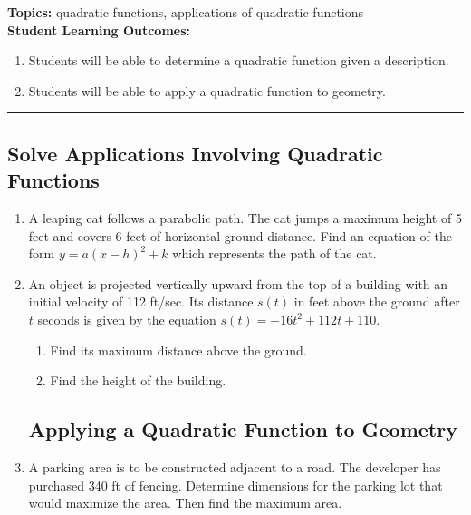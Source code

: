 
\noindent \textbf{Topics:}  quadratic functions, applications of quadratic functions\\

\noindent \textbf{Student Learning Outcomes:}
\begin{enumerate}
\item Students will be able to determine a quadratic function given a description.
\item Students will be able to apply a quadratic function to geometry.
\end{enumerate}

\hrule 

\bigskip

\subsection{Solve Applications Involving Quadratic Functions}


\begin{enumerate}
\item A leaping cat follows a parabolic path. The cat jumps a maximum height of 5 feet and covers 6 feet of horizontal ground distance. Find an equation of the form $y = a(x-h)^2+k$ which represents the path of the cat. \vfill

\item An object is projected vertically upward from the top of a building with an initial velocity of 112 ft/sec. Its distance $s(t)$ in feet above the ground after $t$ seconds is given by the equation $s(t)=-16t^2 + 112t + 110.$
\begin{enumerate}
\item Find its maximum distance above the ground.
\item Find the height of the building.
\end{enumerate}

\vfill



\newpage


\subsection{Applying a Quadratic Function to Geometry}


\item A parking area is to be constructed adjacent to a road.  The developer has purchased 340 ft of fencing.  Determine dimensions for the parking lot that would maximize the area.  Then find the maximum area.


\vfill



\end{enumerate}

